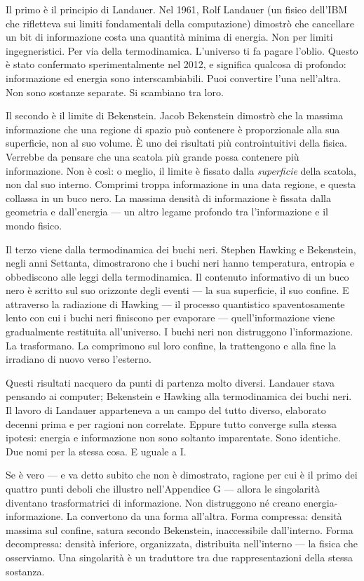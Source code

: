 \documentclass[11pt, twoside, openright]{book}
\begin{document}
Il primo è il principio di Landauer. Nel 1961, Rolf Landauer (un fisico dell'IBM che rifletteva sui limiti fondamentali della computazione) dimostrò che cancellare un bit di informazione costa una quantità minima di energia. Non per limiti ingegneristici. Per via della termodinamica. L'universo ti fa pagare l'oblio. Questo è stato confermato sperimentalmente nel 2012, e significa qualcosa di profondo: informazione ed energia sono interscambiabili. Puoi convertire l'una nell'altra. Non sono sostanze separate. Si scambiano tra loro.

Il secondo è il limite di Bekenstein. Jacob Bekenstein dimostrò che la massima informazione che una regione di spazio può contenere è proporzionale alla sua superficie, non al suo volume. È uno dei risultati più controintuitivi della fisica. Verrebbe da pensare che una scatola più grande possa contenere più informazione. Non è così: o meglio, il limite è fissato dalla \textit{superficie} della scatola, non dal suo interno. Comprimi troppa informazione in una data regione, e questa collassa in un buco nero. La massima densità di informazione è fissata dalla geometria e dall'energia --- un altro legame profondo tra l'informazione e il mondo fisico.

Il terzo viene dalla termodinamica dei buchi neri. Stephen Hawking e Bekenstein, negli anni Settanta, dimostrarono che i buchi neri hanno temperatura, entropia e obbediscono alle leggi della termodinamica. Il contenuto informativo di un buco nero è scritto sul suo orizzonte degli eventi --- la sua superficie, il suo confine. E attraverso la radiazione di Hawking --- il processo quantistico spaventosamente lento con cui i buchi neri finiscono per evaporare --- quell'informazione viene gradualmente restituita all'universo. I buchi neri non distruggono l'informazione. La trasformano. La comprimono sul loro confine, la trattengono e alla fine la irradiano di nuovo verso l'esterno.

Questi risultati nacquero da punti di partenza molto diversi. Landauer stava pensando ai computer; Bekenstein e Hawking alla termodinamica dei buchi neri. Il lavoro di Landauer apparteneva a un campo del tutto diverso, elaborato decenni prima e per ragioni non correlate. Eppure tutto converge sulla stessa ipotesi: energia e informazione non sono soltanto imparentate. Sono identiche. Due nomi per la stessa cosa. E uguale a I.

Se è vero --- e va detto subito che non è dimostrato, ragione per cui è il primo dei quattro punti deboli che illustro nell'Appendice G --- allora le singolarità diventano trasformatrici di informazione. Non distruggono né creano energia-informazione. La convertono da una forma all'altra. Forma compressa: densità massima sul confine, satura secondo Bekenstein, inaccessibile dall'interno. Forma decompressa: densità inferiore, organizzata, distribuita nell'interno --- la fisica che osserviamo. Una singolarità è un traduttore tra due rappresentazioni della stessa sostanza.
\end{document}
